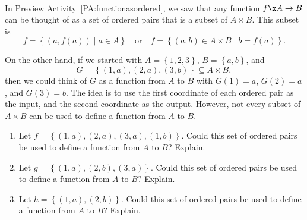 \hbreak

\begin{previewactivity} \label{PA:functionasordered2} \hfill \\
In Preview Activity~\ref{PA:functionasordered}, we saw that any function  $f\x A \to B$ can be thought of as a set of ordered pairs that is a subset of  $A \times B$.  This subset is
\[
f = \left\{ { {( {a, f( a )} ) } \mid a \in A} \right\} \quad \text{or} 
\quad f = \left\{ {( {a, b} ) \in A \times B   \mid b = f( a )} \right\}\!.
\]

\noindent
On the other hand, if we started with  $A = \left\{ {1, 2, 3} \right\}$, 
$B = \left\{ {a, b} \right\}$, and 
\[
G = \left\{ {( {1, a} ), ( {2, a} ), ( {3, b} )} \right\} \subseteq A \times B ,
\]
then we could think of  $G$  as a function from  $A$  to  $B$  with  $G( 1 ) = a$, $G( 2 ) = a$, and $G( 3 ) = b.$  The idea is to use the first coordinate of each ordered pair as the input, and the second coordinate as the output.  However, not every subset of  $A \times B$ can be used to define a function from  $A$  to  $B$.

\begin{enumerate}
\item Let  $f = \left\{ {( {1, a} ), ( {2, a} ), ( {3, a} ), ( {1, b} )} \right\}$. Could this set of ordered pairs be used to define a function from  $A$  to  $B$?  Explain.

\item Let $g = \left\{ {( {1, a} ), ( {2, b} ), ( {3, a} )} \right\}$.  Could this set of ordered pairs be used to define a function from  $A$  to  $B$?  Explain.

\item Let $h = \left\{ {( {1, a} ), ( {2, b} )} \right\}$.  Could this set of ordered pairs be used to define a function from  $A$  to  $B$?  Explain.
\end{enumerate}
\end{previewactivity}
\hbreak
%
